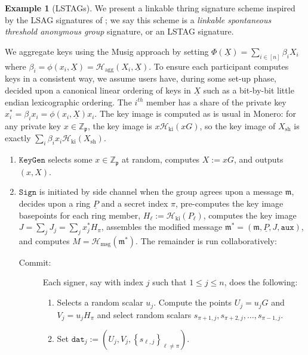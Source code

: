 \documentclass{iacrtrans}
\theoremstyle{definition}
\numberwithin{theorem}{subsection}
\numberwithin{lemma}{theorem}
\newtheorem{ex}[theorem]{Example}
\newcommand{\scalarField}{\mathbb{Z}_{\mathfrak{p}}}
\newcommand{\m}{\mathfrak{m}}
\begin{document}
\begin{ex}[LSTAGs]\label{implementation}
We present a linkable thring signature scheme inspired by the LSAG signatures of \cite{liu2004linkable}; we say this scheme is a \textit{linkable spontaneous threshold anonymous group} signature, or an LSTAG signature. 

We aggregate keys using the Musig approach by setting $\Phi(\underline{X}) = \sum_{i \in [n]} \beta_i X_i$ where $\beta_i = \phi(x_i, \underline{X}) = \mathcal{H}_{\text{agg}}(X_i, \underline{X})$. To ensure each participant computes keys in a consistent way, we assume users have, during some set-up phase, decided upon a canonical linear ordering of keys in $\underline{X}$ such as a bit-by-bit little endian lexicographic ordering. The $i^{th}$ member has a share of the private key $x^*_i = \beta_i x_i = \phi(x_i, \underline{X})x_i$. The key image is computed as is usual in Monero: for any private key $x \in \scalarField$, the key image is $x\mathcal{H}_{\text{ki}}(xG)$, so the key image of $X_{\text{sh}}$ is exactly $\sum_i \beta_i x_i \mathcal{H}_{\text{ki}}(X_{\text{sh}})$.

\begin{enumerate}
\item $\texttt{KeyGen}$ selects some $x \in \scalarField$ at random, computes $X := xG$, and outputs $(x,X)$.

\item $\texttt{Sign}$ is initiated by side channel when the group agrees upon a message $\m$, decides upon a ring $\underline{P}$ and a secret index $\pi$, pre-computes the key image basepoints for each ring member, $H_\ell := \mathcal{H}_{\text{ki}}(P_\ell)$, computes the key image $J = \sum_j J_j = \sum_j x^*_j H_\pi$, assembles the modified message $\m^* = (\m, \underline{P}, J, \texttt{aux})$, and computes $M = \mathcal{H}_{\text{msg}}(\m^*)$. The remainder is run collaboratively:

\begin{description}
\item [Commit:] Each signer, say with index $j$ such that $1 \leq j \leq n$, does the following: 
\begin{enumerate}
\item Selects a random scalar $u_j$. Compute the points $U_j = u_j G$ and $V_j = u_j H_\pi$ and select random scalars $s_{\pi+1, j}, s_{\pi+2, j}, \ldots, s_{\pi-1,j}$. 

\item Set $\texttt{dat}_{j} := (U_j, V_j, \left\{s_{\ell,j}\right\}_{\ell\neq \pi})$.


\end{enumerate}
\end{description}
\end{enumerate}
\end{ex}
\end{document}
